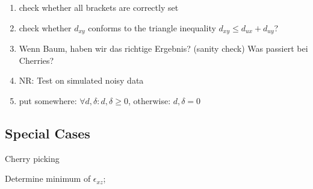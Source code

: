 \documentclass{article}
\newcommand{\TODO}[1]{\begingroup\color{red}#1\endgroup}
\newcommand{\NR}[1]{\begingroup\color{orange}#1\endgroup}
\begin{document}
\begin{enumerate}
 \item \TODO{check whether all brackets are correctly set} \\
 \item \TODO{check whether $d_{xy}$ 
  conforms to the triangle inequality $d_{xy} \leq d_{ux} + d_{uy}$?} \\
 \item \TODO{Wenn Baum, haben wir das richtige Ergebnis? (sanity check) Was passiert bei Cherries?} \\
 \item \TODO{NR: Test on simulated noisy data} \\
 \item \TODO{put somewhere: $\forall d,\delta: d,\delta\geq 0$, otherwise: $d,\delta = 0$}
\end{enumerate}





\subsection*{Special Cases} 




\begin{algorithm}[H]
\caption{\NR{Cherry picking}}
\label{alg:cherries}
 \SetAlgoLined
 Determine minimum of $\epsilon_{xz}$;
\end{algorithm}


      
   
\end{document}
